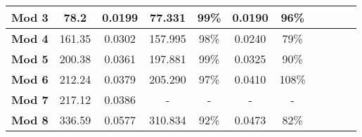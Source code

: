 \begin{table}[]
{\begin{tabular}{@{}c|c|c|cccc|llll@{}}
			\textbf{Mod 3}        & 78.2                                                               & 0.0199                                                                 & 77.331            & 99\%              & 0.0190            & 96\%              &                                       &                                       &                                      &                                       \\ \midrule
			\textbf{Mod 4}        & 161.35                                                             & 0.0302                                                                 & 157.995           & 98\%              & 0.0240            & 79\%              &                                       &                                       &                                      &                                       \\ \midrule
			\textbf{Mod 5}        & 200.38                                                             & 0.0361                                                                 & 197.881           & 99\%              & 0.0325           & 90\%              &                                       &                                       &                                      &                                       \\ \midrule
			\textbf{Mod 6}        & 212.24                                                             & 0.0379                                                                 & 205.290            & 97\%              & 0.0410            & 108\%             &                                       &                                       &                                      &                                       \\ \midrule
			\textbf{Mod 7}        & 217.12                                                             & 0.0386                                                                 & -                 & -                 & -                & -                 &                                       &                                       &                                      &                                       \\ \midrule
			\textbf{Mod 8}        & 336.59                                                             & 0.0577                                                                 & 310.834           & 92\%              & 0.0473           & 82\%              &                                       &                                       &                                      &                                       \\ \midrule

\end{tabular}}
\end{table}
